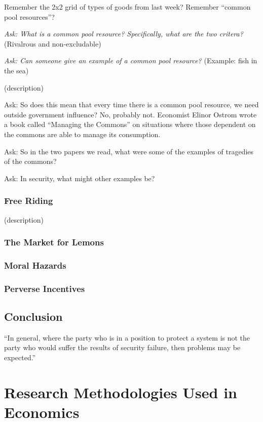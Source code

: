 \documentclass[11pt]{article}
\begin{document}
Remember the 2x2 grid of types of goods from last week? Remember ``common pool resources''?

{\it Ask: What is a common pool resource? Specifically, what are the two critera?} (Rivalrous and non-excludable)

{\it Ask: Can someone give an example of a common pool resource?} (Example: fish in the sea)

(description)

{Ask: So does this mean that every time there is a common pool resource, we need outside government influence?} No, probably not. Economist Elinor Ostrom wrote a book called ``Managing the Commons'' on situations where those dependent on the commons are able to manage its consumption.

{Ask: So in the two papers we read, what were some of the examples of tragedies of the commons?}

{Ask: In security, what might other examples be?}

\subsubsection{Free Riding}

(description)

\subsubsection{The Market for Lemons}

\subsubsection{Moral Hazards}

\subsubsection{Perverse Incentives}

\subsection{Conclusion}

“In general, where the party who is in a position to protect a system is not the party who would suffer the results of security failure, then problems may be expected.”


\section{Research Methodologies Used in Economics}
\end{document}
